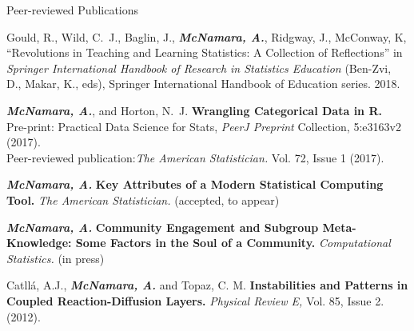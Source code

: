 \documentclass{resume} %
\begin{document}

\begin{rSection}{Peer-reviewed Publications}

Gould, R., Wild, C.~J., Baglin, J., {\bf \em McNamara, A.}, Ridgway, J., McConway, K, ``Revolutions in Teaching and Learning Statistics: A Collection of Reflections'' in {\em Springer International Handbook of Research in Statistics Education} (Ben-Zvi, D., Makar, K., eds), Springer International Handbook of Education series. 2018. 

{\bf \em{McNamara, A.}}, and Horton, N.~J. { \bf Wrangling Categorical Data in R. } 
\\Pre-print: \hfill Practical Data Science for Stats, {\em PeerJ Preprint} Collection, 5:e3163v2 (2017).  
\\Peer-reviewed publication:\hfill {\em The American Statistician.} Vol. 72, Issue 1 (2017). 

{\bf \em{McNamara, A.}} {\bf Key Attributes of a Modern Statistical Computing Tool. } {\em The American Statistician.} (accepted, to appear) 

{\bf \em McNamara, A.} {\bf Community Engagement and Subgroup Meta-Knowledge: Some Factors in the Soul of a Community.} { \em Computational Statistics.} (in press)

{Catll{\'a}, A.J., {\bf \em McNamara, A.} and Topaz, C. M. } {\bf Instabilities and Patterns in Coupled Reaction-Diffusion Layers.} {\em Physical Review E,} Vol. 85, Issue 2. (2012). 

\end{rSection}


\end{document}
